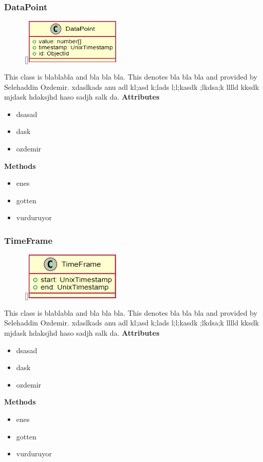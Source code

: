 \subsubsection{DataPoint}
\begin{figure}
    \raisebox{0pt}[\dimexpr{}\baselineskip\relax]{\includegraphics[width=4.5cm]{classes/workspace-management/9.png}}
\end{figure} 
\par
This class is blablabla and bla bla bla. This denotes bla bla bla and provided by Selehaddin Ozdemir. xdaslkads anu adl kl;asd k;lads l;l;kasdk ;lkdsa;k lllld kksdk mjdask hdaksjhd haso sadjh salk da.
\newline
\newline
\textbf{Attributes}
\begin{itemize}
    \item dsasad
    \item dask
    \item ozdemir
\end{itemize}
\textbf{Methods}
\begin{itemize}
    \item enes
    \item gotten
    \item vurduruyor
\end{itemize}

\subsubsection{TimeFrame}
\begin{figure}
    \raisebox{0pt}[\dimexpr{}\baselineskip\relax]{\includegraphics[width=4.5cm]{classes/workspace-management/10.png}}
\end{figure} 
\par
This class is blablabla and bla bla bla. This denotes bla bla bla and provided by Selehaddin Ozdemir. xdaslkads anu adl kl;asd k;lads l;l;kasdk ;lkdsa;k lllld kksdk mjdask hdaksjhd haso sadjh salk da.
\newline
\newline
\textbf{Attributes}
\begin{itemize}
    \item dsasad
    \item dask
    \item ozdemir
\end{itemize}
\textbf{Methods}
\begin{itemize}
    \item enes
    \item gotten
    \item vurduruyor
\end{itemize}

